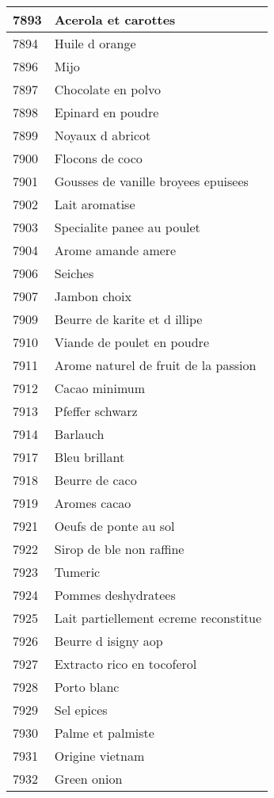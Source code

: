 \begin{longtable}{|l|l|}
7893 & Acerola et carottes \\ \hline 
7894 & Huile d orange \\ \hline 
7896 & Mijo \\ \hline 
7897 & Chocolate en polvo \\ \hline 
7898 & Epinard en poudre \\ \hline 
7899 & Noyaux d abricot \\ \hline 
7900 & Flocons de coco \\ \hline 
7901 & Gousses de vanille broyees epuisees \\ \hline 
7902 & Lait aromatise \\ \hline 
7903 & Specialite panee au poulet \\ \hline 
7904 & Arome amande amere \\ \hline 
7906 & Seiches \\ \hline 
7907 & Jambon choix \\ \hline 
7909 & Beurre de karite et d illipe \\ \hline 
7910 & Viande de poulet en poudre \\ \hline 
7911 & Arome naturel de fruit de la passion \\ \hline 
7912 & Cacao minimum \\ \hline 
7913 & Pfeffer schwarz \\ \hline 
7914 & Barlauch \\ \hline 
7917 & Bleu brillant \\ \hline 
7918 & Beurre de caco \\ \hline 
7919 & Aromes cacao \\ \hline 
7921 & Oeufs de ponte au sol \\ \hline 
7922 & Sirop de ble non raffine \\ \hline 
7923 & Tumeric \\ \hline 
7924 & Pommes deshydratees \\ \hline 
7925 & Lait partiellement ecreme reconstitue \\ \hline 
7926 & Beurre d isigny aop \\ \hline 
7927 & Extracto rico en tocoferol \\ \hline 
7928 & Porto blanc \\ \hline 
7929 & Sel epices \\ \hline 
7930 & Palme et palmiste \\ \hline 
7931 & Origine vietnam \\ \hline 
7932 & Green onion \\ \hline 

\end{longtable}
